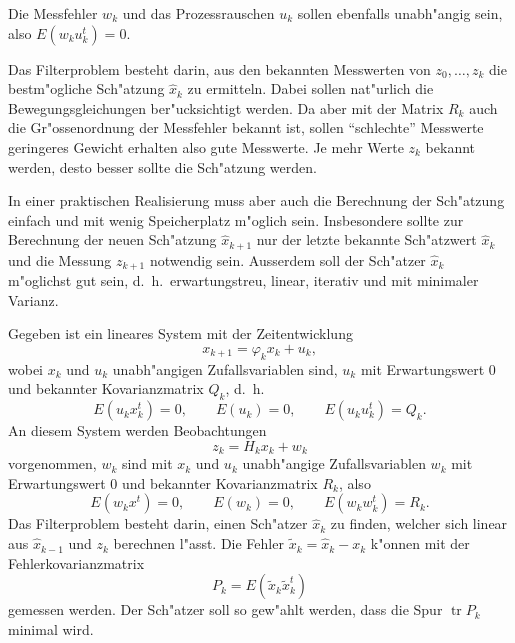 Die Messfehler $w_k$ und das Prozessrauschen $u_k$ sollen ebenfalls unabh"angig
sein, also $E(w_ku_k^t)=0$.

Das Filterproblem besteht darin, aus den bekannten Messwerten von $z_0,\dots,z_k$
die bestm"ogliche Sch"atzung $\hat x_k$ zu ermitteln.
Dabei sollen
nat"urlich die Bewegungsgleichungen ber"ucksichtigt werden.
Da aber
mit der Matrix $R_k$ auch die Gr"ossenordnung der Messfehler bekannt ist,
sollen ``schlechte'' Messwerte geringeres Gewicht erhalten also gute
Messwerte.
Je mehr Werte $z_k$ bekannt werden, desto besser sollte die
Sch"atzung werden.

In einer praktischen Realisierung muss aber auch die Berechnung der Sch"atzung
einfach und mit wenig Speicherplatz m"oglich sein.
Insbesondere sollte zur
Berechnung der neuen Sch"atzung $\hat x_{k+1}$ nur der letzte bekannte Sch"atzwert
$\hat x_k$ und die Messung $z_{k+1}$ notwendig sein.
Ausserdem soll der Sch"atzer
$\hat x_k$ m"oglichst gut sein, d.~h.~erwartungstreu, linear, iterativ und
mit minimaler Varianz.

\begin{definition}Gegeben ist ein lineares System mit der Zeitentwicklung
\[
x_{k+1}=\varphi_kx_k+u_k,
\]
wobei $x_k$ und $u_k$ unabh"angigen Zufallsvariablen sind,
$u_k$ mit Erwartungswert $0$ und bekannter Kovarianzmatrix $Q_k$, d.~h.
\[
E(u_kx_k^t)=0,\qquad E(u_k)=0,\qquad E(u_ku_k^t)=Q_k.
\]
An diesem System werden Beobachtungen
\[
z_k=H_kx_k+w_k
\]
vorgenommen, $w_k$ sind mit $x_k$ und $u_k$ unabh"angige Zufallsvariablen
$w_k$ mit Erwartungswert $0$ und bekannter Kovarianzmatrix $R_k$, also
\[
E(w_kx^t)=0,\qquad E(w_k)=0,\qquad E(w_kw_k^t)=R_k.
\]
Das Filterproblem besteht darin, einen Sch"atzer $\hat x_k$ zu
finden, welcher sich linear aus $\hat x_{k-1}$ und $z_k$ berechnen l"asst.
Die Fehler $\tilde x_k=\hat x_k-x_k$ k"onnen mit der Fehlerkovarianzmatrix
\[
P_k=E(\tilde x_k\tilde x_k^t)
\]
gemessen werden.
Der Sch"atzer soll so gew"ahlt werden, dass die Spur
$\operatorname{tr}P_k$ minimal wird.
\end{definition}

